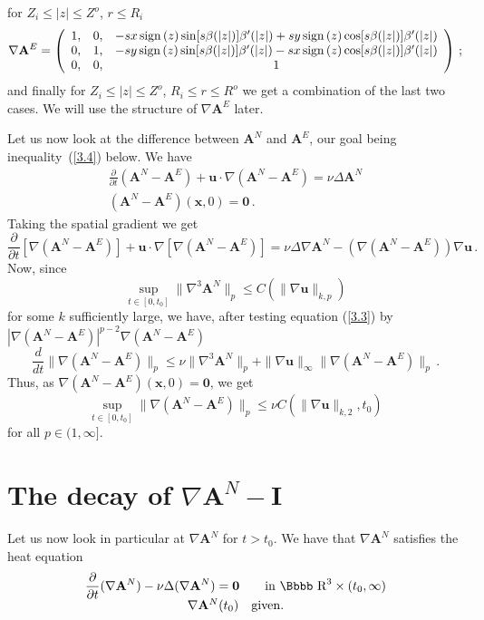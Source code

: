 \documentclass[12pt,twoside]{article}
\newcommand{\bA}{\mathbf{A}}
\newcommand {\sign}{{\rm sign}\,}
\newcommand {\rdd}{\mbox{\Bbbb R}}
\newcommand {\bnul}{{\mathbf {0}}}
\newcommand {\bu}{{\mathbf{u}}}
\newcommand {\bI}{{\mathbf{I}}}
\newcommand {\bx}{{\mathbf{x}}}
\newcommand {\pder}[2]{\frac {\partial #1}{\partial #2}}
\begin{document}
for $Z_i\leq |z|\leq Z^o$, $r\leq R_i$
$$
\nabla \bA^E =
\left( \begin{array}{ccc}
1, & 0, & -s x  \, \sign(z) \sin [s \be (|z|)] \be'(|z|)  +s y \, \sign(z) \cos 
[s \be (|z|)] \be'(|z|)\\
0, & 1, &  -s y \, \sign(z) \sin [s \be (|z|)] \be'(|z|)  -sx \, \sign(z) \cos 
[s \be (|z|)] \be'(|z|)\\
0, & 0, & 1 \end{array} \right)\, ;
$$
and finally for $Z_i\leq |z|\leq Z^o$, $R_i \leq r\leq R^o$ we get a combination
of the last two cases. We will use the structure of $\nabla \bA^E$ later.

\bigskip

Let us now look at the difference between $\bA^N$ and $\bA^E$, our goal
being inequality~(\ref{3.4}) below.  We have
$$
\begin{array}{c}
\displaystyle \pder{}{t} (\bA^N - \bA^E) + \bu \cdot \nabla (\bA^N - \bA^E) = \nu \Delta \bA^N
\\ [6pt]
(\bA^N - \bA^{E})(\bx, 0) = \bnul\, .
\end{array}
$$
Taking the spatial gradient we get
\begin{equation} \label{3.3}
\pder{}{t} [\nabla (\bA^N - \bA^E)] + \bu \cdot \nabla [\nabla (\bA^N - \bA^E)]
 = \nu \Delta \nabla \bA^N - (\nabla (\bA^N-\bA^E))\nabla \bu\, .
\end{equation}
Now, since 
$$
\sup _{t \in [0,t_0]}\|\nabla ^3 \bA^N\|_p \leq C (\|\nabla \bu\|_{k,p})
$$
for some $k$ sufficiently large, we have, after testing equation (\ref{3.3})
by $|\nabla (\bA^N-\bA^E)|^{p-2}\nabla (\bA^N - \bA^E)$
$$
\frac{d}{dt} \|\nabla (\bA^N-\bA^E)\|_p \leq \nu \|\nabla^3 \bA^N\|_p +
\|\nabla \bu\|_\infty  \|\nabla (\bA^N-\bA^E)\|_p\, .
$$
Thus, as $\nabla (\bA^N-\bA^E)(\bx,0) = \bnul$, we get
\begin{equation} \label {3.4}
\sup _{t \in [0,t_0]} \|\nabla (\bA^N-\bA^E)\|_p \leq \nu 
C(\|\nabla \bu\|_{k,2}, t_0)
\end{equation}
for all $p\in (1,\infty]$.



\section{The decay of $\nabla \bA^N-\bI$}
\setcounter{equation}{0}

Let us now look in particular at $\nabla \bA^N$ for $t > t_0$. We have that 
$\nabla \bA^N$ satisfies the heat equation
$$
\begin{array}{c}
\displaystyle \pder{}{t} (\nabla \bA^N) - \nu \Delta (\nabla \bA^N) = \bnul
 \qquad {\rm in \ }
\rdd^3 \times (t_0,\infty) \\
\nabla \bA^N(t_0) \quad {\rm given.}
\end{array}
$$
\end{document}
